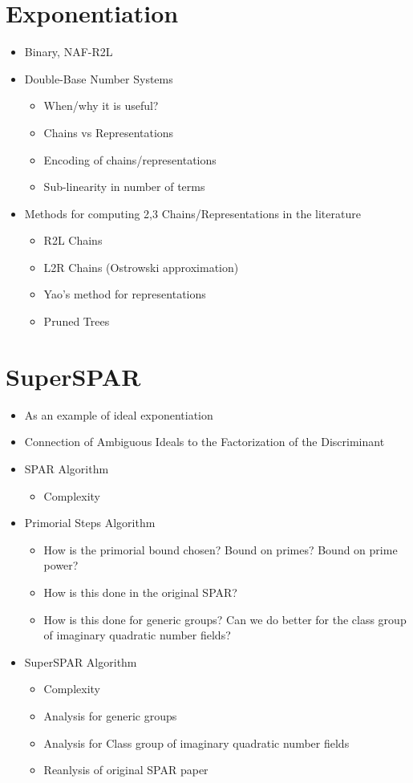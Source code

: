 \documentclass[11pt, letterpaper]{article}
\theoremstyle{definition}
\begin{document}
\section{Exponentiation}
\begin{itemize}
\item Binary, NAF-R2L
\item Double-Base Number Systems
	\begin{itemize}
	\item When/why it is useful?
	\item Chains vs Representations
	\item Encoding of chains/representations
	\item Sub-linearity in number of terms
	\end{itemize}
\item Methods for computing 2,3 Chains/Representations in the literature
	\begin{itemize}
	\item R2L Chains
	\item L2R Chains (Ostrowski approximation)
	\item Yao's method for representations
	\item Pruned Trees
	\end{itemize}
\end{itemize}


\bigbreak
\section{SuperSPAR}
\begin{itemize}
\item As an example of ideal exponentiation
\item Connection of Ambiguous Ideals to the Factorization of the Discriminant
\item SPAR Algorithm
	\begin{itemize}
		\item Complexity
	\end{itemize}
\item Primorial Steps Algorithm
	\begin{itemize}
	\item How is the primorial bound chosen?  Bound on primes? Bound on prime power?
	\item How is this done in the original SPAR?
	\item How is this done for generic groups?  Can we do better for the class group of imaginary quadratic number fields?
	\end{itemize}
\item SuperSPAR Algorithm
	\begin{itemize}
		\item Complexity
		\item Analysis for generic groups
		\item Analysis for Class group of imaginary quadratic number fields
		\item Reanlysis of original SPAR paper
	\end{itemize}
\end{itemize}
\end{document}
